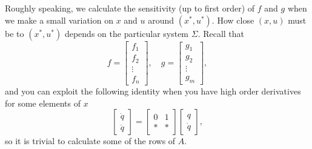 Roughly speaking, we calculate the sensitivity (up to first order) of $f$ and $g$ when we make a small variation on $x$ and $u$ around $(x^*,u^*)$. How close $(x,u)$ must be to $(x^*,u^*)$ depends on the particular system $\Sigma$.
Recall that
\begin{equation}
	f = \begin{bmatrix}f_1 \\ f_2 \\ \vdots \\ f_n \end{bmatrix}, \quad
	g = \begin{bmatrix}g_1 \\ g_2 \\ \vdots \\ g_m \end{bmatrix} \nonumber,
\end{equation} and you can exploit the following identity when you have high order derivatives for some elements of $x$
\begin{equation}
	\begin{bmatrix}
	\dot q \\ \ddot q
	\end{bmatrix}
	=
	\begin{bmatrix}
	0 & 1 \\
	\ast & \ast
	\end{bmatrix}
	\begin{bmatrix}
	q \\ \dot q
	\end{bmatrix}, \nonumber
\end{equation}
so it is trivial to calculate some of the rows of $A$.


